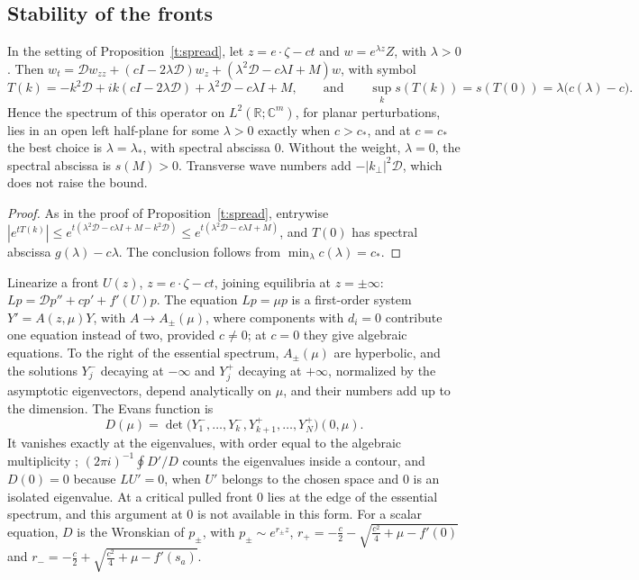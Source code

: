 \subsection{Stability of the fronts}\label{s:spaSta}
In the setting of Proposition~\ref{t:spread}, let $z=e\cdot\zeta-ct$ and $w=e^{\lambda z}Z$, with $\lambda>0$. Then $w_t=\mathcal Dw_{zz}+(cI-2\lambda\mathcal D)w_z+(\lambda^2\mathcal D-c\lambda I+M)w$, with symbol
\[
 T(k)=-k^2\mathcal D+ik(cI-2\lambda\mathcal D)+\lambda^2\mathcal D-c\lambda I+M,\qquad\text{and}\qquad \sup_ks(T(k))=s(T(0))=\lambda\bigl(c(\lambda)-c\bigr).
\]
Hence the spectrum of this operator on $L^2(\mathbb R;\mathbb C^m)$, for planar perturbations, lies in an open left half-plane for some $\lambda>0$ exactly when $c>c_*$, and at $c=c_*$ the best choice is $\lambda=\lambda_*$, with spectral abscissa $0$. Without the weight, $\lambda=0$, the spectral abscissa is $s(M)>0$. Transverse wave numbers add $-|k_\perp|^2\mathcal D$, which does not raise the bound.
\eeP
\begin{proof}
As in the proof of Proposition~\ref{t:spread}, entrywise $|e^{tT(k)}|\le e^{t(\lambda^2\mathcal D-c\lambda I+M-k^2\mathcal D)}\le e^{t(\lambda^2\mathcal D-c\lambda I+M)}$, and $T(0)$ has spectral abscissa $g(\lambda)-c\lambda$. The conclusion follows from $\min_\lambda c(\lambda)=c_*$.
\end{proof}

Linearize a front $U(z)$, $z=e\cdot\zeta-ct$, joining equilibria at $z=\pm\infty$: $Lp=\mathcal Dp''+cp'+f'(U)p$. The equation $Lp=\mu p$ is a first-order system $Y'=A(z,\mu)Y$, with $A\to A_\pm(\mu)$, where components with $d_i=0$ contribute one equation instead of two, provided $c\ne0$; at $c=0$ they give algebraic equations. To the right of the essential spectrum, $A_\pm(\mu)$ are hyperbolic, and the solutions $Y^-_j$ decaying at $-\infty$ and $Y^+_j$ decaying at $+\infty$, normalized by the asymptotic eigenvectors, depend analytically on $\mu$, and their numbers add up to the dimension. The Evans function is
\[
 D(\mu)=\det\bigl(Y^-_1,\ldots,Y^-_k,Y^+_{k+1},\ldots,Y^+_N\bigr)(0,\mu).
\]
It vanishes exactly at the eigenvalues, with order equal to the algebraic multiplicity \cite{AlexanderGardnerJones1990,Sandstede2002}; $(2\pi i)^{-1}\oint D'/D$ counts the eigenvalues inside a contour, and $D(0)=0$ because $LU'=0$, when $U'$ belongs to the chosen space and $0$ is an isolated eigenvalue. At a critical pulled front $0$ lies at the edge of the essential spectrum, and this argument at $0$ is not available in this form. For a scalar equation, $D$ is the Wronskian of $p_\pm$, with $p_\pm\sim e^{r_\pm z}$, $r_+=-\frac c2-\sqrt{\frac{c^2}4+\mu-f'(0)}$ and $r_-=-\frac c2+\sqrt{\frac{c^2}4+\mu-f'(s_a)}$.
\eeR

